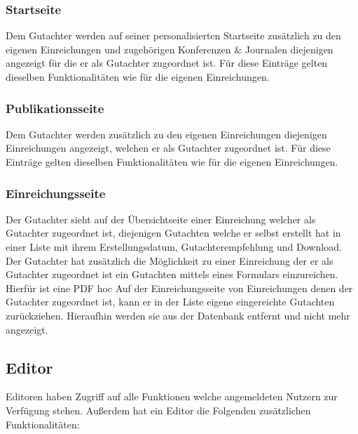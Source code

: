 \subsubsection{Startseite}
\begin{description}
    \XXitem{}{} Dem Gutachter werden auf seiner personalisierten Startseite zusätzlich zu den eigenen
    Einreichungen und zugehörigen Konferenzen \& Journalen diejenigen angezeigt für die er als Gutachter
    zugeordnet ist.
    Für diese Einträge gelten dieselben Funktionalitäten wie für die eigenen Einreichungen.
\end{description}

\subsubsection{Publikationsseite}
\begin{description}
    \XXitem{}{} Dem Gutachter werden zusätzlich zu den eigenen Einreichungen diejenigen Einreichungen angezeigt,
    welchen er als Gutachter zugeordnet ist. Für diese Einträge gelten dieselben Funktionalitäten wie für die
    eigenen Einreichungen. %
\end{description}

\subsubsection{Einreichungsseite}
\begin{description}
    \XXitem{}{} Der Gutachter sieht auf der Übersichtseite einer Einreichung welcher als Gutachter
    zugeordnet ist, diejenigen Gutachten welche er selbst erstellt hat in einer
    Liste mit ihrem Erstellungsdatum, Gutachterempfehlung und Download.
    \XXitem{}{} Der Gutachter hat zusätzlich die Möglichkeit zu einer Einreichung der er als Gutachter zugeordnet ist
    ein Gutachten mittels eines Formulars einzureichen. Hierfür ist eine PDF hoc
     Auf der Einreichungsseite von Einreichungen denen der Gutachter zugeordnet ist,
    kann er in der Liste eigene eingereichte Gutachten zurückziehen. Hieraufhin werden sie aus
    der Datenbank entfernt und nicht mehr angezeigt.
\end{description}

\subsection{Editor}
Editoren haben Zugriff auf alle Funktionen welche angemeldeten Nutzern zur Verfügung stehen.
Außerdem hat ein Editor die Folgenden zusätzlichen Funktionalitäten:

